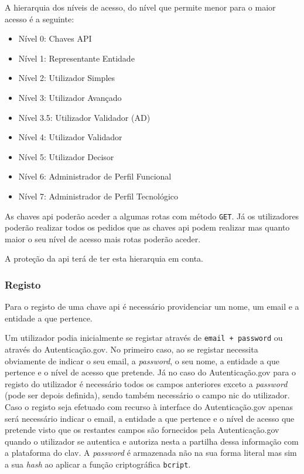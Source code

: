 A hierarquia dos níveis de acesso, do nível que permite menor para o maior acesso é a seguinte:
\begin{itemize}
    \item Nível 0: Chaves API
    \item Nível 1: Representante Entidade
    \item Nível 2: Utilizador Simples
    \item Nível 3: Utilizador Avançado
    \item Nível 3.5: Utilizador Validador (AD)
    \item Nível 4: Utilizador Validador
    \item Nível 5: Utilizador Decisor
    \item Nível 6: Administrador de Perfil Funcional
    \item Nível 7: Administrador de Perfil Tecnológico
\end{itemize}

As chaves \acrshort{api} poderão aceder a algumas rotas com método \texttt{GET}.
Já os utilizadores poderão realizar todos os pedidos que as chaves \acrshort{api} podem realizar mas quanto maior o seu nível de acesso mais rotas poderão aceder.

A proteção da \acrshort{api} terá de ter esta hierarquia em conta.

\subsubsection{Registo}

Para o registo de uma chave \acrshort{api} é necessário providenciar um nome, um email e a entidade a que pertence.

Um utilizador podia inicialmente se registar através de \texttt{email + password} ou através do Autenticação.gov. No primeiro caso, ao se registar necessita obviamente de indicar o seu email, a \textit{password}, o seu nome, a entidade a que pertence e o nível de acesso que pretende. Já no caso do Autenticação.gov para o registo do utilizador é necessário todos os campos anteriores exceto a \textit{password} (pode ser depois definida), sendo também necessário o campo \acrfull{nic} do utilizador. Caso o registo seja efetuado com recurso à interface do Autenticação.gov apenas será necessário indicar o email, a entidade a que pertence e o nível de acesso que pretende visto que os restantes campos são fornecidos pela Autenticação.gov quando o utilizador se autentica e autoriza nesta a partilha dessa informação com a plataforma do \acrshort{clav}.
A \textit{password} é armazenada não na sua forma literal mas sim a sua \textit{hash} ao aplicar a função criptográfica \texttt{bcript}.

